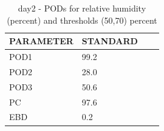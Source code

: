 \begin{table}[p!]
\begin{center}
\begin{tabular}{|l|l|l|l|}
\hline
\multicolumn{1}{|c|}{\cellcolor[HTML]{C0C0C0}\textbf{PARAMETER}} & \multicolumn{1}{c|}{\cellcolor[HTML]{C0C0C0}\textbf{STANDARD}}  \\
\hline
\cellcolor[HTML]{C0C0C0}POD1  & 99.2                                \\
\cellcolor[HTML]{C0C0C0}POD2  & 28.0                                \\
\cellcolor[HTML]{C0C0C0}POD3  & 50.6                                \\
\cellcolor[HTML]{C0C0C0}PC    & 97.6                                \\
\cellcolor[HTML]{C0C0C0}EBD   & 0.2                                \\
\hline
\end{tabular}
\caption{day2 - PODs for relative humidity (percent) and thresholds (50,70) percent}
\label{tab:podrhFT:day2}
\end{center}
\end{table}
